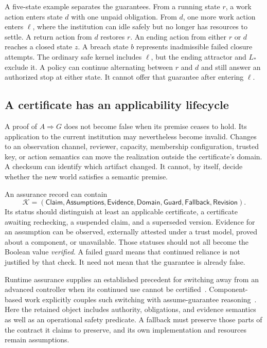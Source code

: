\documentclass[11pt,letterpaper]{article}
\theoremstyle{plain}
\theoremstyle{definition}
\theoremstyle{remark}
\begin{document}
A five-state example separates the guarantees. From a running state $r$, a work action enters state $d$ with one unpaid obligation. From $d$, one more work action enters $\ell$, where the institution can idle safely but no longer has resources to settle. A return action from $d$ restores $r$. An ending action from either $r$ or $d$ reaches a closed state $z$. A breach state $b$ represents inadmissible failed closure attempts. The ordinary safe kernel includes $\ell$, but the ending attractor and $L_*$ exclude it. A policy can continue alternating between $r$ and $d$ and still answer an authorized stop at either state. It cannot offer that guarantee after entering $\ell$.

\subsection{A certificate has an applicability lifecycle}\label{sec:certificate-lifecycle}

A proof of $A\Rightarrow G$ does not become false when its premise ceases to hold. Its application to the current institution may nevertheless become invalid. Changes to an observation channel, reviewer, capacity, membership configuration, trusted key, or action semantics can move the realization outside the certificate's domain. A checksum can identify which artifact changed. It cannot, by itself, decide whether the new world satisfies a semantic premise.

An assurance record can contain
\[
\mathcal K=(\mathsf{Claim},\mathsf{Assumptions},\mathsf{Evidence},
\mathsf{Domain},\mathsf{Guard},\mathsf{Fallback},\mathsf{Revision}).
\]
Its status should distinguish at least an applicable certificate, a certificate awaiting rechecking, a suspended claim, and a superseded version. Evidence for an assumption can be observed, externally attested under a trust model, proved about a component, or unavailable. Those statuses should not all become the Boolean value \emph{verified}. A failed guard means that continued reliance is not justified by that check. It need not mean that the guarantee is already false.

Runtime assurance supplies an established precedent for switching away from an advanced controller when its continued use cannot be certified~\cite{blackboxsimplex}. Component-based work explicitly couples such switching with assume-guarantee reasoning~\cite{componentsimplex}. Here the retained object includes authority, obligations, and evidence semantics as well as an operational safety predicate. A fallback must preserve those parts of the contract it claims to preserve, and its own implementation and resources remain assumptions.
\end{document}
